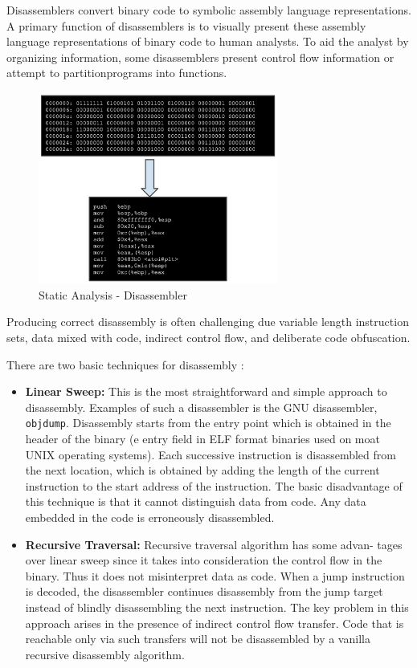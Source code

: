 \documentclass{article}
\begin{document}
Disassemblers convert binary code to symbolic assembly language representations. A primary function of disassemblers 
is to visually present these assembly language representations of binary code to human analysts. To aid the analyst 
by organizing information, some disassemblers present control ﬂow information or attempt to partitionprograms into 
functions. \citep{disass}
\begin{figure}[H]
\centering
\includegraphics[width=0.7\textwidth]{img/disassembler.jpg}
\caption{Static Analysis - Disassembler}
\label{fig:disassembler}
\end{figure}
Producing correct disassembly is often challenging due variable length instruction sets, data mixed with code,
indirect control ﬂow, and deliberate code obfuscation.

There are two basic techniques for disassembly \citep{stripped}:
\begin{itemize}
\item{\textbf{Linear Sweep:}} This is the most straightforward and simple approach to disassembly. 
Examples of such a disassembler is the GNU disassembler, \texttt{objdump}. Disassembly starts from the entry point which 
is obtained in the header of the binary (e entry field in ELF format binaries used on moat UNIX operating systems). 
Each successive instruction is disassembled from the next location, which is obtained by adding the length of the 
current instruction to the start address of the instruction. The basic disadvantage of this technique is that it 
cannot distinguish data from code. Any data embedded in the code is erroneously disassembled.
\item{\textbf{Recursive Traversal:}} Recursive traversal algorithm has some advan- tages over linear sweep since 
it takes into consideration the control flow in the binary. Thus it does not misinterpret data as code. When a 
jump instruction is decoded, the disassembler continues disassembly from the jump target instead of blindly 
disassembling the next instruction. The key problem in this approach arises in the presence of indirect control 
flow transfer. Code that is reachable only via such transfers will not be disassembled by a vanilla recursive 
disassembly algorithm.
\end{itemize}
\end{document}
